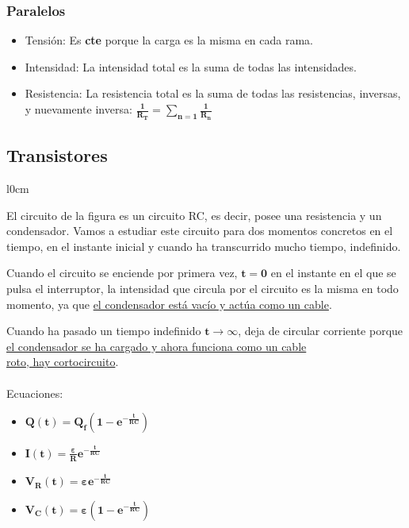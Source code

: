 \subsubsection{Paralelos}
\begin{itemize}
        \item Tensión: Es \textbf{cte} porque la carga es la misma en cada rama.
        \item Intensidad: La intensidad total es la suma de todas las intensidades.
        \item Resistencia: La resistencia total es la suma de todas las resistencias, inversas, y nuevamente inversa: \(\bm{\frac{1}{R_T} = \sum_{n = 1}\frac{1}{R_n}}\)
\end{itemize}
\subsection{Transistores}
\begin{wrapfigure}{l}{0cm}
\end{wrapfigure}
 El circuito de la figura es un circuito RC, es decir, posee una resistencia y un condensador.
Vamos a estudiar este circuito para dos momentos concretos en el tiempo, en el instante inicial y cuando ha transcurrido mucho tiempo, indefinido.
\vspace{.5cm}
\par  Cuando el circuito se enciende por primera vez, \(\bm{t = 0}\) en el instante en el que se pulsa el interruptor, la intensidad que circula por el circuito es la misma en todo momento, ya que \underline{el condensador está vacío y actúa como un cable}.
\vspace{.5cm}
\par \hspace{-0.5cm}Cuando ha pasado un tiempo indefinido \(\bm{t \rightarrow \infty}\), deja de circular corriente porque \underline{el condensador se ha cargado y ahora funciona como un cable}\\
\underline{roto, hay cortocircuito}.
\\
\\
 Ecuaciones:
\begin{itemize}
        \item \(\bm{Q(t)=Q_f(1-e^{-\frac{t}{RC}})}\)
        \item \(\bm{I(t)=\frac{\varepsilon}{R}e^{-\frac{t}{RC}}}\)
        \item \(\bm{V_R(t) = \varepsilon e^{-\frac{t}{RC}}}\)
        \item \(\bm{V_C(t) = \varepsilon(1-e^{-\frac{t}{RC}})}\)
\end{itemize}
